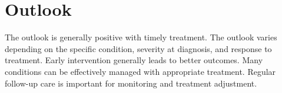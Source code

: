 \section{Outlook}
The outlook is generally positive with timely treatment. The outlook varies depending on the specific condition, severity at diagnosis, and response to treatment. Early intervention generally leads to better outcomes. Many conditions can be effectively managed with appropriate treatment. Regular follow-up care is important for monitoring and treatment adjustment.
